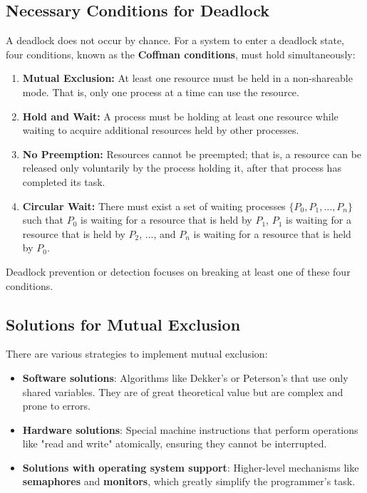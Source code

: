 \subsection{Necessary Conditions for Deadlock}
A deadlock does not occur by chance. For a system to enter a deadlock state, four conditions, known as the \textbf{Coffman conditions}, must hold simultaneously:
\begin{enumerate}
    \item \textbf{Mutual Exclusion:} At least one resource must be held in a non-shareable mode. That is, only one process at a time can use the resource.
    \item \textbf{Hold and Wait:} A process must be holding at least one resource while waiting to acquire additional resources held by other processes.
    \item \textbf{No Preemption:} Resources cannot be preempted; that is, a resource can be released only voluntarily by the process holding it, after that process has completed its task.
    \item \textbf{Circular Wait:} There must exist a set of waiting processes $\{P_0, P_1, \dots, P_n\}$ such that $P_0$ is waiting for a resource that is held by $P_1$, $P_1$ is waiting for a resource that is held by $P_2$, ..., and $P_n$ is waiting for a resource that is held by $P_0$.
\end{enumerate}
Deadlock prevention or detection focuses on breaking at least one of these four conditions.

\subsection{Solutions for Mutual Exclusion}
There are various strategies to implement mutual exclusion:
\begin{itemize}
    \item \textbf{Software solutions}: Algorithms like Dekker's or Peterson's that use only shared variables. They are of great theoretical value but are complex and prone to errors.
    \item \textbf{Hardware solutions}: Special machine instructions that perform operations like "read and write" atomically, ensuring they cannot be interrupted.
    \item \textbf{Solutions with operating system support}: Higher-level mechanisms like \textbf{semaphores} and \textbf{monitors}, which greatly simplify the programmer's task.
\end{itemize}

